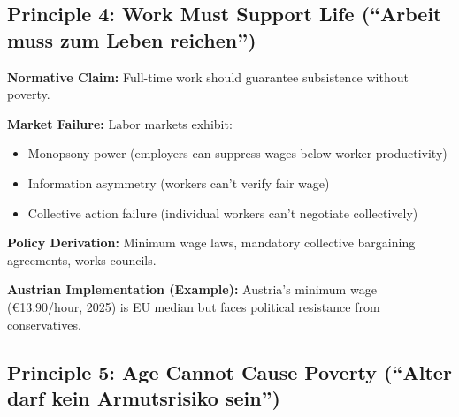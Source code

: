 
\subsection{Principle 4: Work Must Support Life (``Arbeit muss zum Leben reichen'')}

\begin{tcolorbox}[colback=gray!5!white, colframe=gray!75!black,
    title=Principle BF-4: Dignity in Work]

\textbf{Normative Claim:} Full-time work should guarantee subsistence without poverty.

\textbf{Market Failure:} Labor markets exhibit:
\begin{itemize}[nosep]
\item Monopsony power (employers can suppress wages below worker productivity)
\item Information asymmetry (workers can't verify fair wage)
\item Collective action failure (individual workers can't negotiate collectively)
\end{itemize}

\textbf{Policy Derivation:} Minimum wage laws, mandatory collective bargaining agreements, works councils.

\textbf{Austrian Implementation (Example):} Austria's minimum wage (€13.90/hour, 2025) is EU median but faces political resistance from conservatives.

\end{tcolorbox}


\subsection{Principle 5: Age Cannot Cause Poverty (``Alter darf kein Armutsrisiko sein'')}

